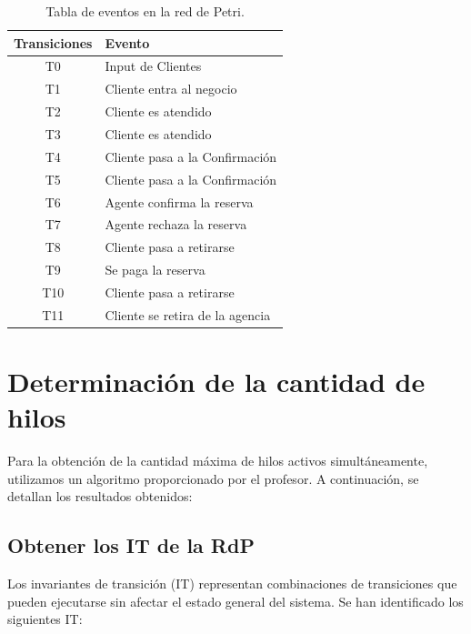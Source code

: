 \documentclass[12pt]{article}
\begin{document}
\begin{table}[H]
    \centering
    \renewcommand{\arraystretch}{1.2}
    \begin{tabularx}{\textwidth}{|c|X|}
    \hline
    \rowcolor{green!20}
    \textbf{Transiciones} & \textbf{Evento} \\ \hline
    T0  & Input de Clientes                \\ \hline
    T1  & Cliente entra al negocio         \\ \hline
    T2  & Cliente es atendido              \\ \hline
    T3  & Cliente es atendido              \\ \hline
    T4  & Cliente pasa a la Confirmación   \\ \hline
    T5  & Cliente pasa a la Confirmación   \\ \hline
    T6  & Agente confirma la reserva       \\ \hline
    T7  & Agente rechaza la reserva        \\ \hline
    T8  & Cliente pasa a retirarse         \\ \hline
    T9  & Se paga la reserva               \\ \hline
    T10 & Cliente pasa a retirarse         \\ \hline
    T11 & Cliente se retira de la agencia  \\ \hline
    \end{tabularx}
    \caption{Tabla de eventos en la red de Petri.}
    \label{tabla:eventos-red-petri}
\end{table}


\section{Determinación de la cantidad de hilos}

Para la obtención de la cantidad máxima de hilos activos simultáneamente, utilizamos un algoritmo proporcionado por el profesor. A continuación, se detallan los resultados obtenidos:

\subsection{ Obtener los IT de la RdP}

Los invariantes de transición (IT) representan combinaciones de transiciones que pueden ejecutarse sin afectar el estado general del sistema. Se han identificado los siguientes IT:
\end{document}
